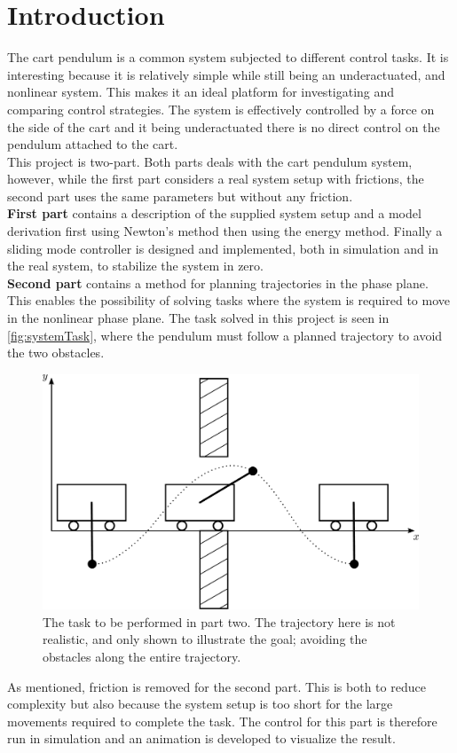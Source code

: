 \chapter{Introduction}\label{chap:introduction}
%
The cart pendulum is a common system subjected to different control tasks. It is interesting because it is relatively simple while still being an underactuated, and nonlinear system. This makes it an ideal platform for investigating and comparing control strategies. The system is effectively controlled by a force on the side of the cart and it being underactuated there is no direct control on the pendulum attached to the cart.\\
This project is two-part. Both parts deals with the cart pendulum system, however, while the first part considers a real system setup with frictions, the second part uses the same parameters but without any friction.\\
\textbf{First part} contains a description of the supplied system setup and a model derivation first using Newton's method then using the energy method. Finally a sliding mode controller is designed and implemented, both in simulation and in the real system, to stabilize the system in zero.\\
\textbf{Second part} contains a method for planning trajectories in the phase plane. This enables the possibility of solving tasks where the system is required to move in the nonlinear phase plane. The task solved in this project is seen in \autoref{fig:systemTask}, where the pendulum must follow a planned trajectory to avoid the two obstacles.
%
\begin{figure}[H]
  \includegraphics[width=.6\textwidth]{figures/systemTask}
  \caption{The task to be performed in part two. The trajectory here is not realistic, and only shown to illustrate the goal; avoiding the obstacles along the entire trajectory.}
  \label{fig:systemTask}
\end{figure}
%
As mentioned, friction is removed for the second part. This is both to reduce complexity but also because the system setup is too short for the large movements required to complete the task. The control for this part is therefore run in simulation and an animation is developed to visualize the result.

